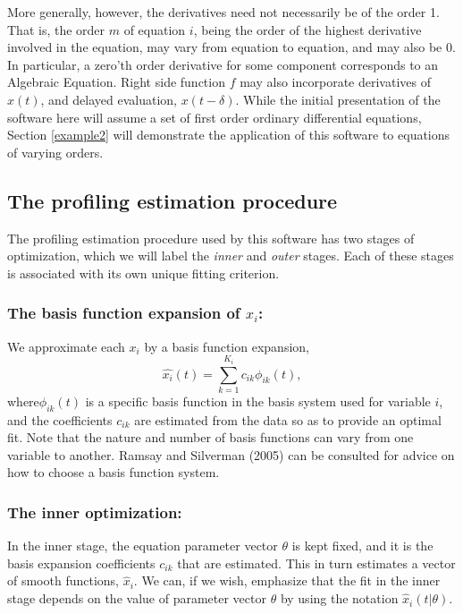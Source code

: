 \documentclass{article}
\begin{document}
More generally, however, the derivatives need not necessarily be of the order 1. That is, the order
$m$ of equation $i$, being the order of the highest derivative involved in the equation, may vary
from equation to equation, and may also be 0.  In particular, a zero'th order derivative for some
component corresponds to an Algebraic Equation.  Right side function $f$ may also incorporate
derivatives of $x(t)$, and delayed evaluation, $x(t-\delta)$. While the initial presentation of the
software here will assume a set of first order ordinary differential equations, Section
\ref{example2} will demonstrate the application of this software to equations of varying orders.

\subsection{The profiling estimation procedure}

The profiling estimation procedure used by this software has two stages of optimization, which we
will label the {\em inner} and {\em outer} stages. Each of these stages is associated with its own
unique fitting criterion.

\subsubsection{The basis function expansion of $x_i$:}

We approximate each $x_i$ by a basis function expansion,
\[
  \hat{x_i}(t) = \sum_{k=1}^{K_i} c_{ik} \phi_{ik}(t),
\]
where$\phi_{ik}(t)$ is a specific basis function in the basis system used for variable $i$, and the
coefficients $c_{ik}$ are estimated from the data so as to provide an optimal fit.  Note that the
nature and number of basis functions can vary from one variable to another.  Ramsay and Silverman
(2005) can be consulted for advice on how to choose a basis function system.

\subsubsection{The inner optimization:}

In the inner stage, the equation parameter vector $\theta$ is kept fixed, and it is the basis
expansion coefficients $c_{ik}$ that are estimated.  This in turn estimates a vector of smooth
functions, $\hat{x}_i$.  We can, if we wish, emphasize that the fit in the inner stage depends on
the value of parameter vector $\theta$ by using the notation $\hat{x}_i(t|\theta)$.
\end{document}
